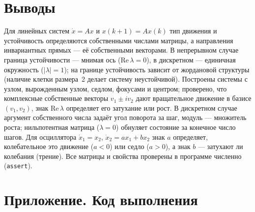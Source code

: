 \documentclass[a4paper, 12pt]{article}
\begin{document}
    \section{Выводы}
    Для линейных систем $\dot x=Ax$ и $x(k+1)=Ax(k)$ тип движения и устойчивость определяются собственными числами матрицы, а направления инвариантных прямых --- её собственными векторами. В непрерывном случае граница устойчивости --- мнимая ось ($\mathrm{Re}\,\lambda=0$), в дискретном --- единичная окружность ($|\lambda|=1$); на границе устойчивость зависит от жордановой структуры (наличие клетки размера~2 делает систему неустойчивой). Построены системы с узлом, вырожденным узлом, седлом, фокусами и центром; проверено, что комплексные собственные векторы $v_1\pm iv_2$ дают вращательное движение в базисе $(v_1,v_2)$, знак $\mathrm{Re}\,\lambda$ определяет его затухание или рост. В дискретном случае аргумент собственного числа задаёт угол поворота за шаг, модуль --- множитель роста; нильпотентная матрица ($\lambda=0$) обнуляет состояние за конечное число шагов. Для осциллятора $\dot x_1=x_2$, $\dot x_2=ax_1+bx_2$ знак $a$ определяет, колебательное это движение ($a<0$) или седло ($a>0$), а знак $b$ --- затухают ли колебания (трение). Все матрицы и свойства проверены в программе численно (\texttt{assert}).

    \section{Приложение. Код выполнения}

\end{document}
